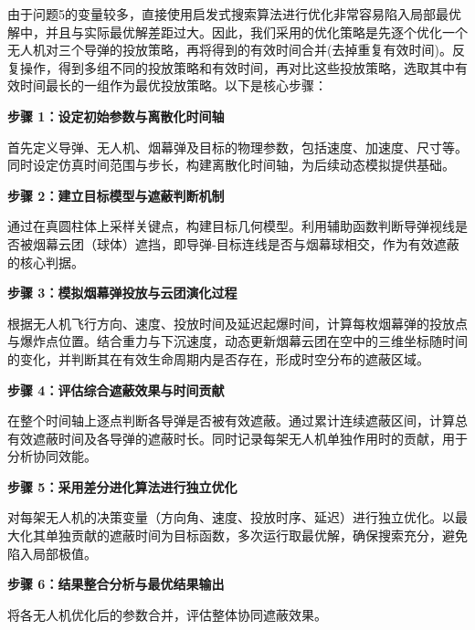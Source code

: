 \documentclass[../main.tex]{subfiles}
\begin{document}

由于问题5的变量较多，直接使用启发式搜索算法进行优化非常容易陷入局部最优解中，并且与实际最优解差距过大。因此，我们采用的优化策略是先逐个优化一个无人机对三个导弹的投放策略，再将得到的有效时间合并(去掉重复有效时间)。反复操作，得到多组不同的投放策略和有效时间，再对比这些投放策略，选取其中有效时间最长的一组作为最优投放策略。以下是核心步骤：

\noindent \textbf{步骤 1：设定初始参数与离散化时间轴}

首先定义导弹、无人机、烟幕弹及目标的物理参数，包括速度、加速度、尺寸等。同时设定仿真时间范围与步长，构建离散化时间轴，为后续动态模拟提供基础。

\noindent \textbf{步骤 2：建立目标模型与遮蔽判断机制} 

通过在真圆柱体上采样关键点，构建目标几何模型。利用辅助函数判断导弹视线是否被烟幕云团（球体）遮挡，即导弹-目标连线是否与烟幕球相交，作为有效遮蔽的核心判据。

\noindent \textbf{步骤 3：模拟烟幕弹投放与云团演化过程} 

根据无人机飞行方向、速度、投放时间及延迟起爆时间，计算每枚烟幕弹的投放点与爆炸点位置。结合重力与下沉速度，动态更新烟幕云团在空中的三维坐标随时间的变化，并判断其在有效生命周期内是否存在，形成时空分布的遮蔽区域。

\noindent \textbf{步骤 4：评估综合遮蔽效果与时间贡献} 

在整个时间轴上逐点判断各导弹是否被有效遮蔽。通过累计连续遮蔽区间，计算总有效遮蔽时间及各导弹的遮蔽时长。同时记录每架无人机单独作用时的贡献，用于分析协同效能。

\noindent \textbf{步骤 5：采用差分进化算法进行独立优化} 

对每架无人机的决策变量（方向角、速度、投放时序、延迟）进行独立优化。以最大化其单独贡献的遮蔽时间为目标函数，多次运行取最优解，确保搜索充分，避免陷入局部极值。

\noindent \textbf{步骤 6：结果整合分析与最优结果输出} 

将各无人机优化后的参数合并，评估整体协同遮蔽效果。
\end{document}
